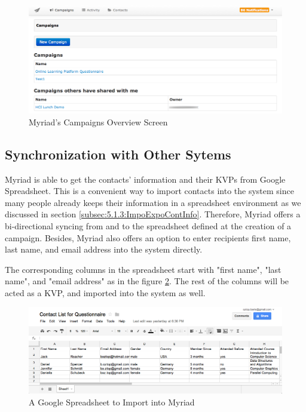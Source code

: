 \begin{figure}[htbp]
	\centering
	\includegraphics[width=1.00\textwidth]{imgs/CampaignsOverviewScreen.png}
	\caption[Myriad's Campaigns Overview Screen]{Myriad's Campaigns Overview Screen}
	\label{fig:CampaignsOverviewScreen}
\end{figure}

\subsection{Synchronization with Other Sytems}
\label{subsec:5.2.2:SyncOtheSyst}

Myriad is able to get the contacts' information and their \ac{KVP}s from Google Spreadsheet. This is a convenient way to import contacts into the system since many people already keeps their information in a spreadsheet environment as we discussed in section \ref{subsec:5.1.3:ImpoExpoContInfo}. Therefore, Myriad offers a bi-directional syncing from and to the spreadsheet defined at the creation of a campaign. Besides, Myriad also offers an option to enter recipients first name, last name, and email address into the system directly.
\vspace{1cm}

The corresponding columns in the spreadsheet start with "first name", "last name", and "email address" as in the figure \ref{fig:GoogleSpreadsheet}. The rest of the columns will be acted as a \ac{KVP}, and imported into the system as well.

\begin{figure}[htbp]
	\centering
	\includegraphics[width=1.00\textwidth]{imgs/GoogleSpreadsheet.png}
	\caption[A Google Spreadsheet to Import into Myriad]{A Google Spreadsheet to Import into Myriad}
	\label{fig:GoogleSpreadsheet}
\end{figure}

